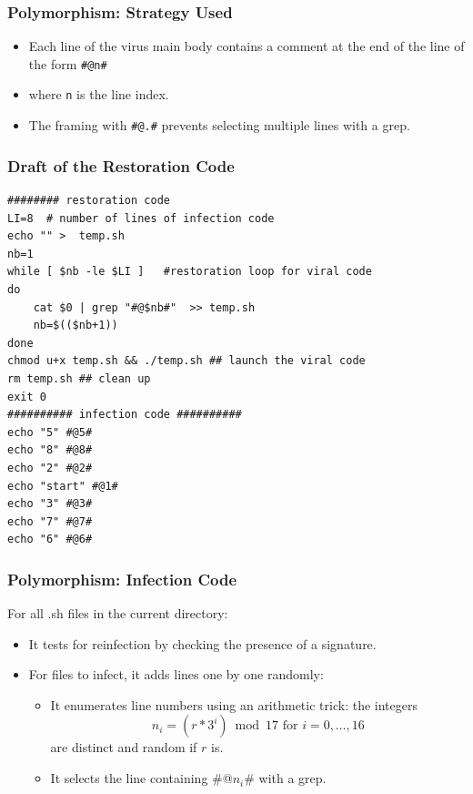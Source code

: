 \documentclass{beamer}
\begin{document}
\begin{frame}[fragile]
  \frametitle{Polymorphism: Strategy Used}
\begin{itemize}
\item Each line of the virus main body contains a comment at the end of the line of the form {\color{blue}\texttt{\#@n\#} }
\item where {\color{blue} \texttt{n}} is the line index.
\item The framing with {\color{blue} \texttt{\#@.\#}} prevents selecting multiple lines with a grep.
\end{itemize}
\end{frame}


\begin{frame}[fragile]
  \frametitle{Draft of the Restoration Code}
  \begin{scriptsize}
\begin{verbatim}
######## restoration code
LI=8  # number of lines of infection code
echo "" >  temp.sh
nb=1
while [ $nb -le $LI ]   #restoration loop for viral code
do
    cat $0 | grep "#@$nb#"  >> temp.sh
    nb=$(($nb+1))
done
chmod u+x temp.sh && ./temp.sh ## launch the viral code
rm temp.sh ## clean up
exit 0
########## infection code ##########
echo "5" #@5#
echo "8" #@8#
echo "2" #@2#
echo "start" #@1#
echo "3" #@3#
echo "7" #@7#
echo "6" #@6#
\end{verbatim}
\end{scriptsize}
\end{frame}


\begin{frame}[fragile]
  \frametitle{Polymorphism: Infection Code}
  For all .sh files in the current directory:
\begin{itemize}
\item It tests for reinfection by checking the presence of a signature.
\item For files to infect, it adds lines one by one randomly:
  \begin{itemize}
  \item It enumerates line numbers using an arithmetic trick: the integers
    $$ n_i=(r * 3^i) \bmod 17 \mbox{ for } i=0,\ldots,16 $$
    are distinct and random if $r$ is.
    \item  It selects the line containing \#@$n_i$\# with a grep.
  \end{itemize}
  \end{itemize}
\end{frame}
\end{document}

